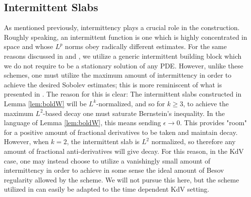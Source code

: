 \documentclass[12pt,reqno,letterpaper]{amsart}
\numberwithin{equation}{section}
\newcommand{\1}{{\bf 1}}
\newcommand{\2}{{\bf 2}}
\theoremstyle{remark}
\theoremstyle{remark}
\begin{document}
\subsection{Intermittent Slabs}\label{subsec:intermittency}

As mentioned previously, intermittency plays a crucial role in the construction. Roughly speaking, an intermittent function is one which is highly concentrated in space and whose $L^p$ norms obey radically different estimates. For the same reasons discussed in \cite{Gismondi} and \cite{Pathak}, we utilize a generic intermittent building block which we do not require to be a stationary solution of any PDE. However, unlike these schemes, one must utilize the maximum amount of intermittency in order to achieve the desired Sobolev estimates; this is more reminiscent of what is presented in \cite{GR}. The reason for this is clear: The intermittent slabs constructed in Lemma \ref{lem:boldW} will be $L^k$-normalized, and so for $k \geq 3$, to achieve the maximum $L^2$-based decay one must saturate Bernstein's inequality. In the language of Lemma \ref{lem:boldW}, this means sending $\epsilon \to 0$. This provides "room" for a positive amount of fractional derivatives to be taken and maintain decay. However, when $k = 2$, the intermittent slab is $L^2$ normalized, so therefore any amount of fractional anti-derivatives will give decay. For this reason, in the \textsf{KdV} case, one may instead choose to utilize a vanishingly small amount of intermittency in order to achieve in some sense the ideal amount of Besov regularity allowed by the scheme. We will not pursue this here, but the scheme utilized in \cite{Pathak} can easily be adapted to the time dependent \textsf{KdV} setting.
\end{document}
